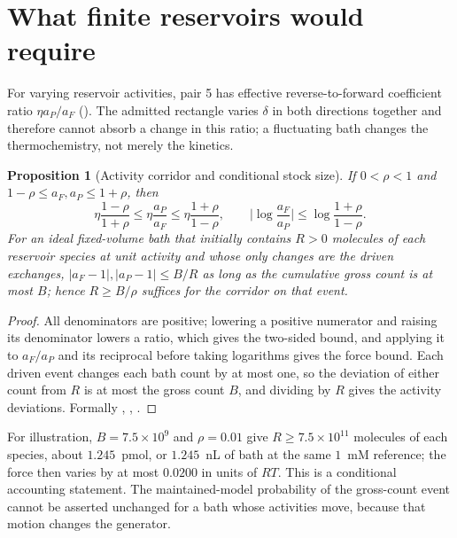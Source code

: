 \documentclass[11pt,a4paper]{article}
\theoremstyle{plain}
\newtheorem{proposition}[theorem]{Proposition}
\theoremstyle{definition}
\theoremstyle{remark}
\begin{document}
\section{What finite reservoirs would require}\label{sec:bath}

For varying reservoir activities, pair 5 has effective reverse-to-forward coefficient ratio $\eta a_P/a_F$ (). The admitted rectangle varies $\delta$ in both directions together and therefore cannot absorb a change in this ratio; a fluctuating bath changes the thermochemistry, not merely the kinetics.

\begin{proposition}[Activity corridor and conditional stock size]\label{prop:bath}
If $0<\rho<1$ and $1-\rho\le a_F,a_P\le1+\rho$, then
\begin{equation}\label{eq:corridor}
 \eta\frac{1-\rho}{1+\rho}\le\eta\frac{a_P}{a_F}\le\eta\frac{1+\rho}{1-\rho},\qquad
 \Big|\log\frac{a_F}{a_P}\Big|\le\log\frac{1+\rho}{1-\rho}.
\end{equation}
For an ideal fixed-volume bath that initially contains $R>0$ molecules of each reservoir species at unit activity and whose only changes are the driven exchanges, $|a_F-1|,|a_P-1|\le B/R$ as long as the cumulative gross count is at most $B$; hence $R\ge B/\rho$ suffices for the corridor on that event.
\end{proposition}
\begin{proof}
All denominators are positive; lowering a positive numerator and raising its denominator lowers a ratio, which gives the two-sided bound, and applying it to $a_F/a_P$ and its reciprocal before taking logarithms gives the force bound. Each driven event changes each bath count by at most one, so the deviation of either count from $R$ is at most the gross count $B$, and dividing by $R$ gives the activity deviations. Formally , , .
\end{proof}
For illustration, $B=7.5\times10^9$ and $\rho=0.01$ give $R\ge7.5\times10^{11}$ molecules of each species, about $1.245$~pmol, or $1.245$~nL of bath at the same $1$~mM reference; the force then varies by at most $0.0200$ in units of $RT$. This is a conditional accounting statement. The maintained-model probability of the gross-count event cannot be asserted unchanged for a bath whose activities move, because that motion changes the generator.
\end{document}
